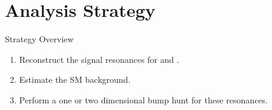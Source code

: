 \documentclass[]{beamer}
\begin{document}
\section{Analysis Strategy}
\label{sec:analysis-strat}

\begin{frame}{Strategy Overview}
  \begin{enumerate}
  \item Reconstruct the signal resonances for \textcolor{blue}{\stopq{}} and \textcolor{red}{\chargino{}}.
  \item Estimate the SM background.
  \item Perform a one or two dimensional bump hunt for these resonances. 
  \end{enumerate}
  \begin{center}
  \end{center}
\end{frame}
\end{document}
